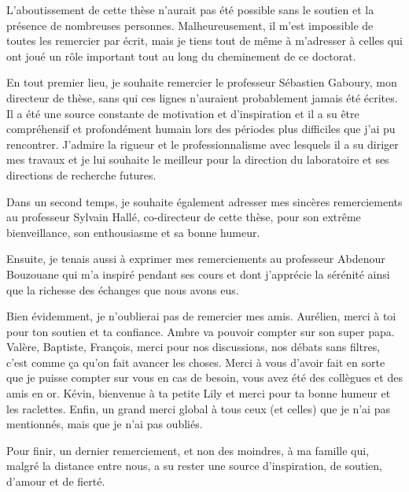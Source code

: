 \begin{ack}

L'aboutissement de cette thèse  n'aurait pas été possible sans le soutien et la présence de nombreuses personnes. Malheureusement, il m'est impossible de toutes les remercier par écrit, mais je tiens tout de même à m'adresser à celles qui ont joué un rôle important tout au long du cheminement de ce doctorat.

En tout premier lieu, je souhaite remercier le professeur Sébastien Gaboury, mon directeur de thèse, sans qui ces lignes n'auraient probablement jamais été écrites. Il a été une source constante de motivation et d'inspiration et il a su être compréhensif et profondément humain lors des périodes plus difficiles que j'ai pu rencontrer. J'admire la rigueur et le professionnalisme avec lesquels il a su diriger mes travaux et je lui souhaite le meilleur pour la direction du laboratoire et ses directions de recherche futures.

Dans un second temps, je souhaite également adresser mes sincères remerciements au professeur Sylvain Hallé, co-directeur de cette thèse, pour son extrême bienveillance, son enthousiasme et sa bonne humeur.

Ensuite, je tenais aussi à exprimer mes remerciements au professeur Abdenour Bouzouane qui m'a inspiré pendant ses cours et dont j'apprécie la sérénité ainsi que la richesse des échanges que nous avons eus.

Bien évidemment, je n'oublierai pas de remercier mes amis. Aurélien, merci à toi pour ton soutien et ta confiance. Ambre va pouvoir compter sur son super papa. Valère, Baptiste, François, merci pour nos discussions, nos débats sans filtres, c'est comme ça qu'on fait avancer les choses. Merci à vous d'avoir fait en sorte que je puisse compter sur vous en cas de besoin, vous avez été des collègues et des amis en or. Kévin, bienvenue à ta petite Lily et merci pour ta bonne humeur et les raclettes. Enfin, un grand merci global à tous ceux (et celles) que je n'ai pas mentionnés, mais que je n'ai pas oubliés.

Pour finir, un dernier remerciement, et non des moindres, à ma famille qui, malgré la distance entre nous, a su rester une source d'inspiration, de soutien, d'amour et de fierté.

\end{ack}
